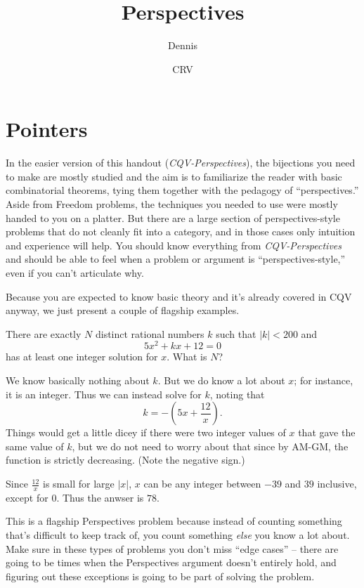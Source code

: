 \documentclass[mast]{lucky}
\title{Perspectives}
\author{Dennis}
\date{CRV}
\begin{document}
\maketitle


\section{Pointers}

In the easier version of this handout (\emph{CQV-Perspectives}), the bijections you need to make are mostly studied and the aim is to familiarize the reader with basic combinatorial theorems, tying them together with the pedagogy of ``perspectives.'' Aside from Freedom problems, the techniques you needed to use were mostly handed to you on a platter. But there are a large section of perspectives-style problems that do not cleanly fit into a category, and in those cases only intuition and experience will help. You should know everything from \emph{CQV-Perspectives} and should be able to feel when a problem or argument is ``perspectives-style,'' even if you can't articulate why.

Because you are expected to know basic theory and it's already covered in CQV anyway, we just present a couple of flagship examples.

\begin{exam}[AMC 12A 2014/19]
There are exactly $N$ distinct rational numbers $k$ such that $|k|<200$ and \[5x^2+kx+12=0\] has at least one integer solution for $x$. What is $N$?
\end{exam}

\begin{sol}
We know basically nothing about $k.$ But we do know a lot about $x$; for instance, it is an integer. Thus we can instead solve for $k$, noting that
\[k=-\left(5x+\frac{12}{x}\right).\]
Things would get a little dicey if there were two integer values of $x$ that gave the same value of $k$, but we do not need to worry about that since by AM-GM, the function is strictly decreasing. (Note the negative sign.)

Since $\frac{12}{x}$ is small for large $|x|$, $x$ can be any integer between $-39$ and $39$ inclusive, except for $0.$ Thus the anwser is $78.$
\end{sol}

This is a flagship Perspectives problem because instead of counting something that's difficult to keep track of, you count something \textit{else} you know a lot about. Make sure in these types of problems you don't miss ``edge cases'' -- there are going to be times when the Perspectives argument doesn't entirely hold, and figuring out these exceptions is going to be part of solving the problem. 
\end{document}
